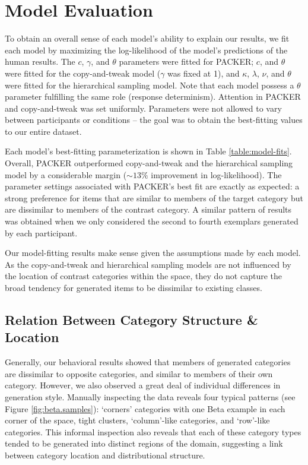 \documentclass[10pt,letterpaper]{article}
\begin{document}
\section{Model Evaluation}
To obtain an overall sense of each model's ability to explain our results, we fit each model by maximizing the log-likelihood of the model's predictions of the human results. The $c$, $\gamma$, and $\theta$ parameters were fitted for PACKER; $c$, and $\theta$ were fitted for the copy-and-tweak model ($\gamma$ was fixed at 1), and $\kappa$, $\lambda$, $\nu$, and $\theta$ were fitted for the hierarchical sampling model. Note that each model possess a $\theta$ parameter fulfilling the same role (response determinism). Attention in PACKER and copy-and-tweak was set uniformly. Parameters were not allowed to vary between participants or conditions -- the goal was to obtain the best-fitting values to our entire dataset.

Each model's best-fitting parameterization is shown in Table \ref{table:model-fits}. Overall, PACKER outperformed copy-and-tweak and the hierarchical sampling model by a considerable margin ($\sim13\%$ improvement in log-likelihood). The parameter settings associated with PACKER's best fit are exactly as expected: a strong preference for items that are similar to members of the target category but are dissimilar to members of the contrast category. A similar pattern of results was obtained when we only considered the second to fourth exemplars generated by each participant.

Our model-fitting results make sense given the assumptions made by each model. As the copy-and-tweak and hierarchical sampling models are not influenced by the location of contrast categories within the space, they do not capture the broad tendency for generated items to be dissimilar to existing classes. 


\subsection{Relation Between Category Structure \& Location}

Generally, our behavioral results showed that members of generated categories are dissimilar to opposite categories, and similar to members of their own category. However, we also observed a great deal of individual differences in generation style. Manually inspecting the data reveals four typical patterns (see Figure \ref{fig:beta.samples}): `corners' categories with one Beta example in each corner of the space, tight clusters, `column'-like categories, and `row'-like categories. This informal inspection also reveals that each of these category types tended to be generated into distinct regions of the domain, suggesting a link between category location and distributional structure.
\end{document}
